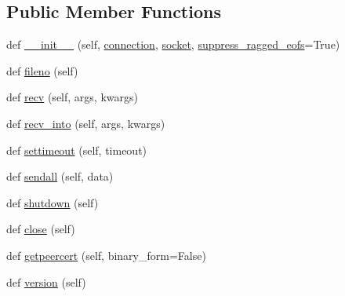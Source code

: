 \subsection*{Public Member Functions}
\begin{DoxyCompactItemize}
\item 
def \hyperlink{classpip_1_1__vendor_1_1urllib3_1_1contrib_1_1pyopenssl_1_1WrappedSocket_a0b0ecb92f470f209dc5802180f206dd3}{\+\_\+\+\_\+init\+\_\+\+\_\+} (self, \hyperlink{classpip_1_1__vendor_1_1urllib3_1_1contrib_1_1pyopenssl_1_1WrappedSocket_a5e45c572e33de518587cde6e2974f01e}{connection}, \hyperlink{classpip_1_1__vendor_1_1urllib3_1_1contrib_1_1pyopenssl_1_1WrappedSocket_a6597c4724062e3e12dd08b65b3d61c5c}{socket}, \hyperlink{classpip_1_1__vendor_1_1urllib3_1_1contrib_1_1pyopenssl_1_1WrappedSocket_a45866f7be30e2912cb4c40342440b6da}{suppress\+\_\+ragged\+\_\+eofs}=True)
\item 
def \hyperlink{classpip_1_1__vendor_1_1urllib3_1_1contrib_1_1pyopenssl_1_1WrappedSocket_a67b43edd56fb8fe4db9de497e6ce29e2}{fileno} (self)
\item 
def \hyperlink{classpip_1_1__vendor_1_1urllib3_1_1contrib_1_1pyopenssl_1_1WrappedSocket_a58b0773b31c386366b95692ea451fab3}{recv} (self, args, kwargs)
\item 
def \hyperlink{classpip_1_1__vendor_1_1urllib3_1_1contrib_1_1pyopenssl_1_1WrappedSocket_a99d023e94b3fccbf1cbc549aedbc341c}{recv\+\_\+into} (self, args, kwargs)
\item 
def \hyperlink{classpip_1_1__vendor_1_1urllib3_1_1contrib_1_1pyopenssl_1_1WrappedSocket_a979be1e02e8962aad6a7625a3c5bcd44}{settimeout} (self, timeout)
\item 
def \hyperlink{classpip_1_1__vendor_1_1urllib3_1_1contrib_1_1pyopenssl_1_1WrappedSocket_aab6a8ae24de60e29acafda28044e0733}{sendall} (self, data)
\item 
def \hyperlink{classpip_1_1__vendor_1_1urllib3_1_1contrib_1_1pyopenssl_1_1WrappedSocket_a8a4146f6c78f8466c372f0b617fb1527}{shutdown} (self)
\item 
def \hyperlink{classpip_1_1__vendor_1_1urllib3_1_1contrib_1_1pyopenssl_1_1WrappedSocket_a16da458c38e51345193372e65e43dbf2}{close} (self)
\item 
def \hyperlink{classpip_1_1__vendor_1_1urllib3_1_1contrib_1_1pyopenssl_1_1WrappedSocket_aeb79c627735e6b4130711ed9b50682a1}{getpeercert} (self, binary\+\_\+form=False)
\item 
def \hyperlink{classpip_1_1__vendor_1_1urllib3_1_1contrib_1_1pyopenssl_1_1WrappedSocket_a5feafd2bff784708293e180679101471}{version} (self)
\end{DoxyCompactItemize}
